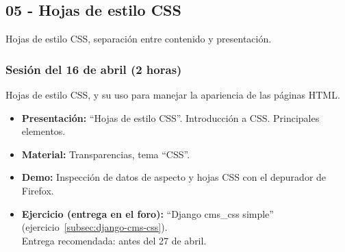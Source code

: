 \documentclass[a4paper,12pt]{article}
\begin{document}

%
%
%
%
\subsection{05 - Hojas de estilo CSS}

Hojas de estilo CSS, separación entre contenido y presentación.

\subsubsection{Sesión del 16 de abril (2 horas)}

Hojas de estilo CSS, y su uso para manejar la apariencia de las páginas HTML.

\begin{itemize}
\item \textbf{Presentación:} ``Hojas de estilo CSS''. Introducción a CSS. Principales elementos.
 \item \textbf{Material:} Transparencias, tema ``CSS''.
\item \textbf{Demo:} Inspección de datos de aspecto y hojas CSS con el depurador de Firefox.
\item \textbf{Ejercicio (entrega en el foro):} ``Django cms\_css simple'' (ejercicio~\ref{subsec:django-cms-css}). \\
Entrega recomendada: antes del 27 de abril.
\end{itemize}
\end{document}
